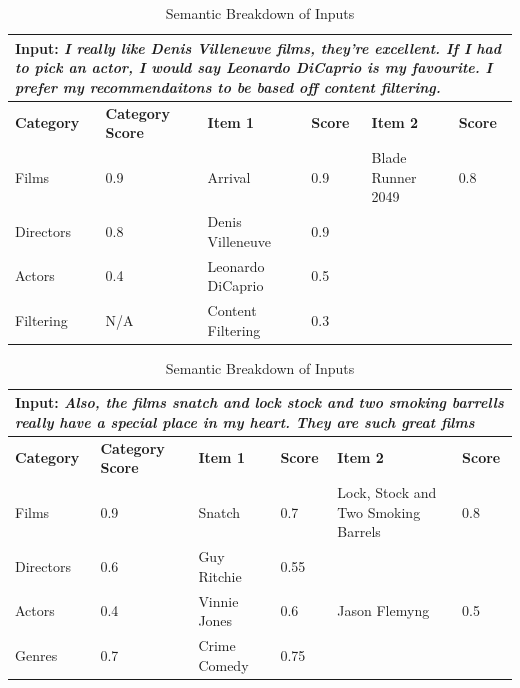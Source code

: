 \begin{table}[H]
    \centering
    \begin{tabular}{|p{2cm}|p{1.5cm}|p{3cm}|p{1cm}|p{3cm}|p{1cm}|}
    \hline
    \multicolumn{6}{|p{0.9\textwidth}|}{\textbf{Input:} \textit{I really like Denis Villeneuve films, they're excellent. If I had to pick an actor, I would say Leonardo DiCaprio is my favourite. I prefer my recommendaitons to be based off content filtering.}} \\ \hline
    \textbf{Category} & \textbf{Category Score} & \textbf{Item 1} & \textbf{Score} & \textbf{Item 2} & \textbf{Score} \\ \hline
    Films   & 0.9          & Arrival                  & 0.9 & Blade Runner 2049       & 0.8    \\ \hline
    Directors       & 0.8  & Denis Villeneuve         & 0.9 & &   \\ \hline
    Actors         & 0.4   & Leonardo DiCaprio        & 0.5 & &   \\ \hline
    Filtering    &  N/A    & Content Filtering        & 0.3 & &   \\ \hline
    \end{tabular}
    \caption{Semantic Breakdown of Inputs}
    \label{tab:semantic_breakdown1}
\end{table}


\begin{table}[H]
    \centering
    \begin{tabular}{|p{2cm}|p{1.5cm}|p{3cm}|p{1cm}|p{3cm}|p{1cm}|}
    \hline
    \multicolumn{6}{|p{0.9\textwidth}|}{\textbf{Input:} \textit{Also, the films snatch and lock stock and two smoking barrells really have a special place in my heart. They are such great films}} \\ \hline
    \textbf{Category} & \textbf{Category Score} & \textbf{Item 1} & \textbf{Score} & \textbf{Item 2} & \textbf{Score} \\ \hline
    Films     &  0.9     & Snatch          & 0.7   & Lock, Stock and Two Smoking Barrels & 0.8\\ \hline
    Directors    & 0.6     & Guy Ritchie      & 0.55 & &  \\ \hline
    Actors  &   0.4   & Vinnie Jones    & 0.6 & Jason Flemyng        & 0.5    \\ \hline
    Genres    & 0.7     & Crime Comedy       & 0.75 & &  \\ \hline
    \end{tabular}
    \caption{Semantic Breakdown of Inputs}
    \label{tab:semantic_breakdown2}
\end{table}
